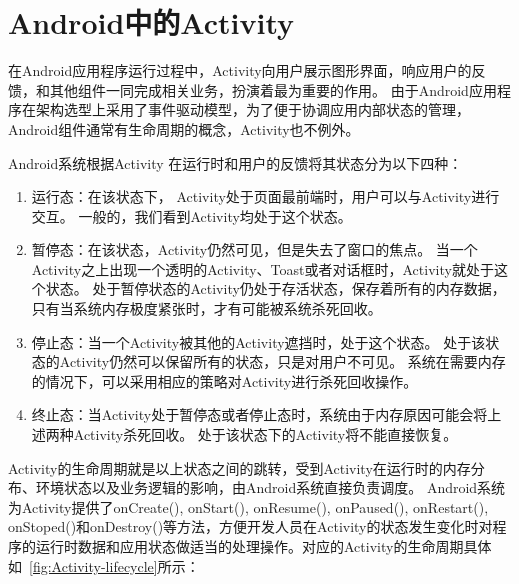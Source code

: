 \section{Android中的Activity}

在Android应用程序运行过程中，Activity向用户展示图形界面，响应用户的反馈，和其他组件一同完成相关业务，扮演着最为重要的作用。
由于Android应用程序在架构选型上采用了事件驱动模型，为了便于协调应用内部状态的管理，Android组件通常有生命周期的概念，Activity也不例外。

Android系统根据Activity 在运行时和用户的反馈将其状态分为以下四种：
\begin{enumerate}
	
	\item 运行态：在该状态下， Activity处于页面最前端时，用户可以与Activity进行交互。
	一般的，我们看到Activity均处于这个状态。
	
	\item 暂停态：在该状态，Activity仍然可见，但是失去了窗口的焦点。
	当一个Activity之上出现一个透明的Activity、Toast或者对话框时，Activity就处于这个状态。
	处于暂停状态的Activity仍处于存活状态，保存着所有的内存数据，只有当系统内存极度紧张时，才有可能被系统杀死回收。
	
	\item 停止态：当一个Activity被其他的Activity遮挡时，处于这个状态。
	处于该状态的Activity仍然可以保留所有的状态，只是对用户不可见。
	系统在需要内存的情况下，可以采用相应的策略对Activity进行杀死回收操作。
	
	\item 终止态：当Activity处于暂停态或者停止态时，系统由于内存原因可能会将上述两种Activity杀死回收。
	处于该状态下的Activity将不能直接恢复。
\end{enumerate}

Activity的生命周期就是以上状态之间的跳转，受到Activity在运行时的内存分布、环境状态以及业务逻辑的影响，由Android系统直接负责调度。
Android系统为Activity提供了onCreate(), onStart(), onResume(), onPaused(), onRestart(),  onStoped()和onDestroy()等方法，方便开发人员在Activity的状态发生变化时对程序的运行时数据和应用状态做适当的处理操作。对应的Activity的生命周期具体如~\autoref{fig:Activity-lifecycle}所示：


